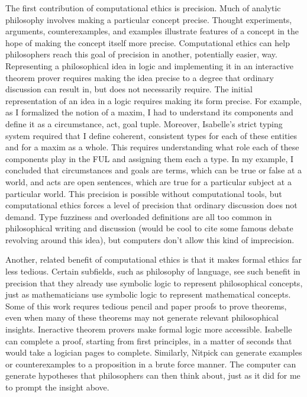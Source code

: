 \begin{isabellebody}
\begin{isamarkuptext}
The first contribution of computational ethics is precision. Much of analytic philosophy involves 
making a particular concept precise. Thought experiments, arguments, counterexamples, and examples 
illustrate features of a concept in the hope of making the concept itself more precise. Computational 
ethics can help philosophers reach this goal of precision in another, potentially easier, way. 
Representing a philosophical idea in logic and implementing it in an interactive theorem prover requires 
making the idea precise to a degree that ordinary discussion can result in, but does not necessarily require. The initial representation 
of an idea in a logic requires making its form precise. For example, 
as I formalized the notion of a maxim, I had to understand its components and define it as a 
circumstance, act, goal tuple. Moreover, Isabelle's strict typing system required that I define 
coherent, consistent types for each of these entities and for a maxim as a whole. This requires understanding 
what role each of these components play in the FUL and assigning them each a type. In my example, I 
concluded that circumstances and goals are terms, which can be true or false at a world, and acts are 
open sentences, which are true for a particular subject at a particular world. This precision is possible 
without computational tools, but computational ethics forces a level of precision that ordinary discussion 
does not demand. Type fuzziness and overloaded definitions are all too common in philosophical writing and 
discussion (would be cool to cite some famous debate revolving around this idea), but computers don't 
allow this kind of imprecision.

Another, related benefit of computational ethics is that it makes formal ethics far less tedious. 
Certain subfields, such as philosophy of language, see such benefit in precision that they already 
use symbolic logic to represent philosophical concepts, just as mathematicians use symbolic logic to 
represent mathematical concepts. Some of this work requres tedious pencil and paper proofs to prove 
theorems, even when many of these theorems may not generate relevant philosophical insights. Ineractive 
theorem provers make formal logic more accessible. Isabelle can complete a proof, starting from first principles, 
in a matter of seconds that would take a logician pages to complete. Similarly, Nitpick can generate 
examples or counterexamples to a proposition in a brute force manner. The computer can generate hypotheses
that philosophers can then think about, just as it did for me to prompt the insight above.


\end{isamarkuptext}
\end{isabellebody}

